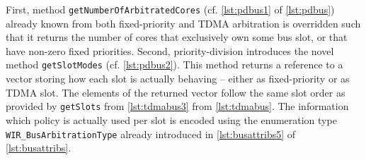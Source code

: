First, method \texttt{getNumberOfArbitratedCores} (cf. \cref{lst:pdbus1} of \cref{lst:pdbus}) already known from both fixed-priority and \gls{TDMA} arbitration is overridden such that it returns the number of cores that exclusively own some bus slot, or that have non-zero fixed priorities.
Second, priority-division introduces the novel method \texttt{getSlotModes} (cf. \cref{lst:pdbus2}).
This method returns a reference to a vector storing how each slot is actually behaving -- either as fixed-priority or as \gls{TDMA} slot.
The elements of the returned vector follow the same slot order as provided by \texttt{getSlots} from \cref{lst:tdmabus3} from \cref{lst:tdmabus}.
The information which policy is actually used per slot is encoded using the enumeration type \texttt{WIR\_BusArbitrationType} already introduced in \cref{lst:busattribs5} of \cref{lst:busattribs}.

\cleardoubleoddpage
